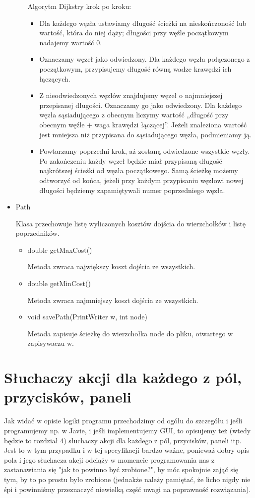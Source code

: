 \documentclass[]{article}
\begin{document}
\begin{itemize}
\begin{itemize}
        Algorytm Dijkstry krok po kroku:
        \begin{itemize}
            \item Dla każdego węzła ustawiamy długość ścieżki na nieskończoność lub wartość, która do niej dąży; długości przy węźle początkowym nadajemy wartość 0. 
            \item Oznaczamy węzeł jako odwiedzony. Dla każdego węzła połączonego z początkowym, przypisujemy długość równą wadze krawędzi ich łączących.
            \item Z nieodwiedzonych węzłów znajdujemy węzeł o najmniejszej przepisanej długości. Oznaczamy go jako odwiedzony. Dla każdego węzła sąsiadującego z obecnym liczymy wartość „długość przy obecnym węźle + waga krawędzi łączącej”. Jeżeli znaleziona wartość jest mniejsza niż przypisana do sąsiadującego węzła, podmieniamy ją.
            \item Powtarzamy poprzedni krok, aż zostaną odwiedzone wszystkie węzły. Po zakończeniu każdy węzeł będzie miał przypisaną długość najkrótszej ścieżki od węzła początkowego. Samą ścieżkę możemy odtworzyć od końca, jeżeli przy każdym przypisaniu węzłowi nowej długości będziemy zapamiętywali numer poprzedniego węzła.
        \end{itemize}
    \end{itemize}
    \item Path
  
    Klasa przechowuje listę wyliczonych kosztów dojścia do wierzchołków i listę poprzedników.
        \begin{itemize}
        \item double getMaxCost()
        
        Metoda zwraca największy koszt dojścia ze wszystkich.
        \item double getMinCost()
        
        Metoda zwraca najmniejszy koszt dojścia ze wszystkich.
        \item void savePath(PrintWriter w, int node)
        
        Metoda zapisuje ścieżkę do wierzchołka node do pliku, otwartego w zapisywaczu w.
    \end{itemize}
\end{itemize}

\section{Słuchaczy akcji dla każdego z pól, przycisków, paneli}\label{header-n279}
 Jak widać w opisie logiki programu przechodzimy od ogółu do szczegółu i jeśli programujemy np. w Javie, i jeśli implementujemy GUI, to opisujemy też (wtedy będzie to rozdział 4) słuchaczy akcji dla każdego z pól, przycisków, paneli itp. Jest to w tym przypadku i w tej specyfikacji bardzo ważne, ponieważ dobry opis pola i jego słuchacza akcji odciąży w momencie programowania nas z zastanawiania się "jak to powinno być zrobione?", by móc spokojnie zająć się tym, by to po prostu było zrobione (jednakże należy pamiętać, że licho nigdy nie śpi i powinniśmy przeznaczyć niewielką część uwagi na poprawność rozwiązania).
\end{document}
